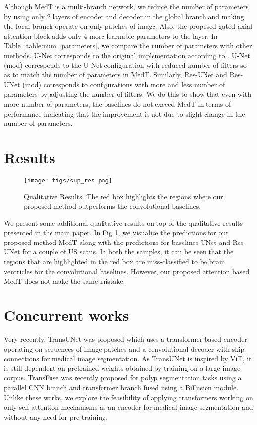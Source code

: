 \documentclass[runningheads]{llncs}
\begin{document}
	Although MedT is a multi-branch network, we reduce the number of parameters by using only 2 layers of encoder and decoder in the global branch and making the local branch operate on only patches of image. Also, the proposed gated axial attention block adds only 4 more learnable parameters to the layer. In Table~\ref{table:num_parameters}, we compare the number of parameters with other methods. U-Net corresponds to the original implementation according to \cite{ronneberger2015u}. U-Net (mod) corresponds to the U-Net configuration with reduced number of filters so as to match the number of parameters in MedT. Similarly, Res-UNet and Res-UNet (mod) corresponds to configurations with more and less number of parameters by adjusting the number of filters. We do this to show that even with more number of parameters, the baselines do not exceed MedT in terms of performance indicating that the improvement is not due to slight change in the number of parameters.  
	
	
	
	
	\section{Results}
	
	\begin{figure}[]
		\centering
		\texttt{[image: figs/sup\_res.png]}\\
		
		\caption{Qualitative Results. The red box highlights the regions where our proposed method outperforms the convolutional baselines. }
		
		\label{qual}
	\end{figure}
	
	We present some additional qualitative results on top of the qualitative results presented in the main paper. In Fig \ref{qual}, we visualize the predictions for our proposed method MedT along with the predictions for baselines UNet and Res-UNet for a couple of US scans. In both the samples, it can be seen that the regions that are highlighted in the red box are miss-classified to be brain ventricles for the convolutional baselines. However, our proposed attention based MedT does not make the same mistake.
	
	
	
	\section{Concurrent works}
	Very recently, TransUNet \cite{chen2021transunet} was proposed which uses a transformer-based encoder operating on sequences of image patches and a convolutional decoder with skip connections for medical image segmentation. As TransUNet is inspired by ViT, it is still
	dependent on pretrained weights obtained by training on a large image corpus. TransFuse \cite{zhang2021transfuse} was recently proposed for polyp segmentation tasks using a parallel CNN branch and transformer branch fused using a BiFusion module. Unlike these works, we explore the feasibility of applying transformers working on only self-attention mechanisms as an encoder for medical image segmentation and without any need for pre-training.
	


\end{document}
